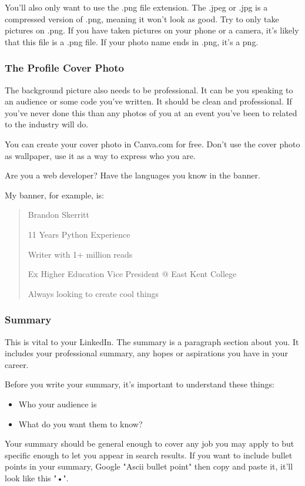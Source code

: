 \documentclass{article}
\begin{document}
You'll also only want to use the .png file extension. The .jpeg or .jpg
is a compressed version of .png, meaning it won't look as good. Try to
only take pictures on .png. If you have taken pictures on your phone or
a camera, it's likely that this file is a .png file. If your photo name
ends in .png, it's a png.
\subsubsection{The Profile Cover Photo}
The background picture also needs to be professional. It can be you
speaking to an audience or some code you've written. It should be clean
and professional. If you've never done this than any photos of you at an
event you've been to related to the industry will do.

You can create your cover photo in Canva.com for free. Don't use the
cover photo as wallpaper, use it as a way to express who you are.

Are you a web developer? Have the languages you know in the banner.

My banner, for example, is:

\begin{quote}Brandon Skerritt

11 Years Python Experience

Writer with 1+ million reads

Ex Higher Education Vice President @ East Kent College

Always looking to create cool things\end{quote}
\subsubsection{Summary}
This is vital to your LinkedIn. The summary is a paragraph section about
you. It includes your professional summary, any hopes or aspirations you
have in your career.

Before you write your summary, it's important to understand these
things:

\begin{itemize}
\item
  Who your audience is
\item
  What do you want them to know?
\end{itemize}

Your summary should be general enough to cover any job you may apply to
but specific enough to let you appear in search results. If you want to
include bullet points in your summary, Google "Ascii bullet point"
then copy and paste it, it'll look like this "•".
\end{document}
